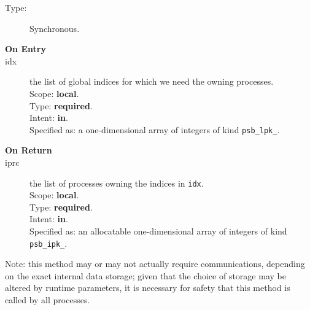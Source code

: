 \begin{description}
\item[Type:] Synchronous.
\item[\bf On Entry]
\item[idx] the list of global indices for which we need the owning processes.\\
Scope: {\bf local}.\\
Type: {\bf required}.\\
Intent: {\bf in}.\\
Specified as: a one-dimensional array of integers of kind \verb|psb_lpk_|. 
\item[\bf On Return]
\item[iprc] the list of processes owning the indices in \verb|idx|.\\
Scope: {\bf local}.\\
Type: {\bf required}.\\
Intent: {\bf in}.\\
Specified as: an allocatable one-dimensional array of integers of kind \verb|psb_ipk_|. 
\end{description}
Note: this method may or may not actually require communications, depending on
the exact internal data storage; given that the choice of storage may
be altered by runtime parameters, it is necessary for safety that this
method is called by all processes. 





